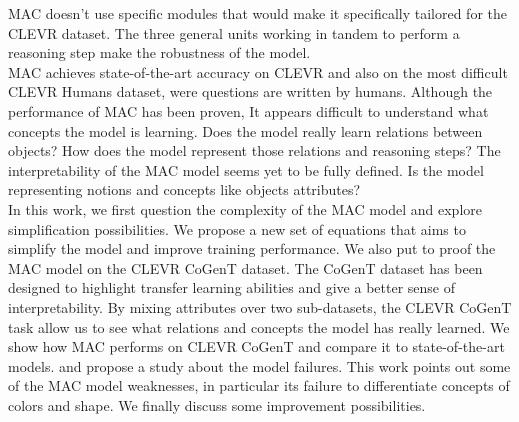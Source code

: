 MAC doesn’t use specific modules that would make it specifically tailored for the CLEVR dataset. The three general units working in tandem to perform a reasoning step make the robustness of the model.\\
MAC achieves state-of-the-art accuracy on CLEVR and also on the most difficult CLEVR Humans dataset, were questions are written by humans. 
Although the performance of MAC has been proven, It appears difficult to understand what concepts the model is learning. 
Does the model really learn relations between objects? 
How does the model represent those relations and reasoning steps? 
The interpretability of the MAC model seems yet to be fully defined.
Is the model representing notions and concepts like objects attributes?\\
In this work, we first question the complexity of the MAC model and explore simplification possibilities. We propose a new set of equations that aims to simplify the model and improve training performance. 
We also put to proof the MAC model on the CLEVR CoGenT dataset. The CoGenT dataset has been designed to highlight transfer learning abilities and give a better sense of interpretability. By mixing attributes over two sub-datasets, the CLEVR CoGenT task allow us to see what relations and concepts the model has really learned. We show how MAC performs on CLEVR CoGenT and compare it to state-of-the-art models.
and propose a study about the model failures. This work points out some of the MAC model weaknesses, in particular its failure to differentiate concepts of colors and shape. We finally discuss some improvement possibilities.
